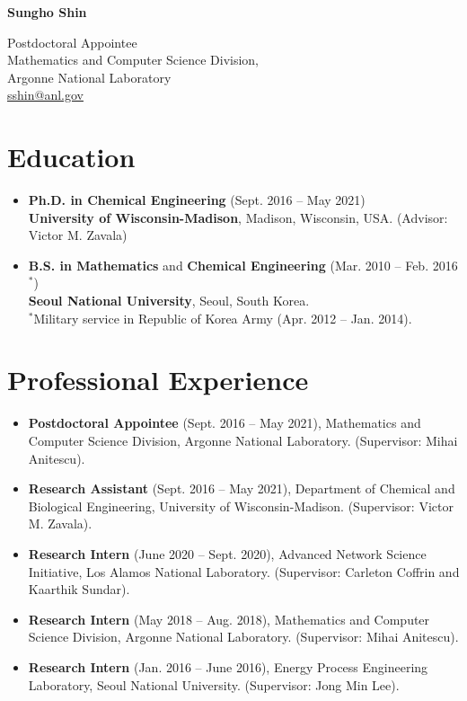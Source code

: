 \documentclass{article}
\begin{document}
\begin{center}
  {\bf\LARGE Sungho Shin}
\end{center}
\begin{center}
  {Postdoctoral Appointee}\\
  {Mathematics and Computer Science Division},\\
  {Argonne National Laboratory}\\
  \href{mailto:sshin@anl.gov}{sshin@anl.gov}
\end{center}

\section*{Education}
\begin{itemize}[leftmargin=*]
\item[]{\bf Ph.D. in Chemical Engineering} (Sept. 2016 -- May 2021)\\
  {\bf University of Wisconsin-Madison}, Madison, Wisconsin, USA. (Advisor: Victor M. Zavala)
\item[]{\bf B.S. in Mathematics} and {\bf Chemical Engineering} (Mar. 2010 -- Feb. 2016$^*$)\\
  {\bf Seoul National University}, Seoul, South Korea.\\
  $^*$Military service in Republic of Korea Army (Apr. 2012 -- Jan. 2014).
\end{itemize}

\section*{Professional Experience}
\begin{itemize}[leftmargin=*]
\item[] {\bf Postdoctoral Appointee} (Sept. 2016 -- May 2021), Mathematics and Computer Science Division, Argonne National Laboratory. (Supervisor: Mihai Anitescu).
\item[] {\bf Research Assistant} (Sept. 2016 -- May 2021), Department of Chemical and Biological Engineering, University of Wisconsin-Madison. (Supervisor: Victor M. Zavala).
\item[] {\bf Research Intern} (June 2020 -- Sept. 2020), Advanced Network Science Initiative, Los Alamos National Laboratory. (Supervisor: Carleton Coffrin and Kaarthik Sundar).
\item[] {\bf Research Intern} (May 2018 -- Aug. 2018), Mathematics and Computer Science Division, Argonne National Laboratory. (Supervisor: Mihai Anitescu).
\item[] {\bf Research Intern} (Jan. 2016 -- June 2016), Energy Process Engineering Laboratory, Seoul National University. (Supervisor: Jong Min Lee).
\end{itemize}
\end{document}
